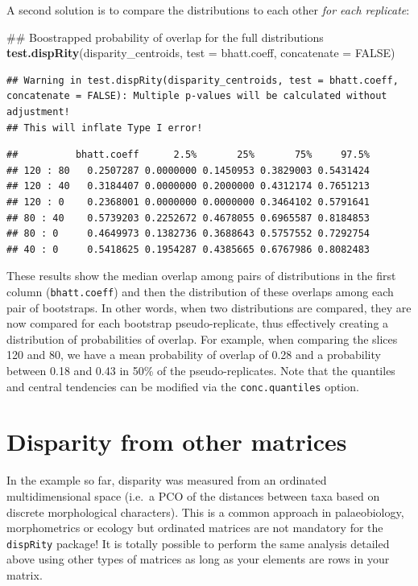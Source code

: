 \documentclass[]{book}
\newenvironment{Shaded}{\begin{snugshade}}{\end{snugshade}}
\newcommand{\KeywordTok}[1]{\textcolor[rgb]{0.13,0.29,0.53}{\textbf{#1}}}
\newcommand{\DataTypeTok}[1]{\textcolor[rgb]{0.13,0.29,0.53}{#1}}
\newcommand{\OtherTok}[1]{\textcolor[rgb]{0.56,0.35,0.01}{#1}}
\newcommand{\NormalTok}[1]{#1}
\theoremstyle{definition}
\theoremstyle{definition}
\theoremstyle{remark}
\begin{document}
A second solution is to compare the distributions to each other
\emph{for each replicate}:

\begin{Shaded}
\begin{Highlighting}[]
\NormalTok{## Boostrapped probability of overlap for the full distributions}
\KeywordTok{test.dispRity}\NormalTok{(disparity_centroids, }\DataTypeTok{test =}\NormalTok{ bhatt.coeff, }\DataTypeTok{concatenate =} \OtherTok{FALSE}\NormalTok{)}
\end{Highlighting}
\end{Shaded}

\begin{verbatim}
## Warning in test.dispRity(disparity_centroids, test = bhatt.coeff, concatenate = FALSE): Multiple p-values will be calculated without adjustment!
## This will inflate Type I error!
\end{verbatim}

\begin{verbatim}
##          bhatt.coeff      2.5%       25%       75%     97.5%
## 120 : 80   0.2507287 0.0000000 0.1450953 0.3829003 0.5431424
## 120 : 40   0.3184407 0.0000000 0.2000000 0.4312174 0.7651213
## 120 : 0    0.2368001 0.0000000 0.0000000 0.3464102 0.5791641
## 80 : 40    0.5739203 0.2252672 0.4678055 0.6965587 0.8184853
## 80 : 0     0.4649973 0.1382736 0.3688643 0.5757552 0.7292754
## 40 : 0     0.5418625 0.1954287 0.4385665 0.6767986 0.8082483
\end{verbatim}

These results show the median overlap among pairs of distributions in
the first column (\texttt{bhatt.coeff}) and then the distribution of
these overlaps among each pair of bootstraps. In other words, when two
distributions are compared, they are now compared for each bootstrap
pseudo-replicate, thus effectively creating a distribution of
probabilities of overlap. For example, when comparing the slices 120 and
80, we have a mean probability of overlap of 0.28 and a probability
between 0.18 and 0.43 in 50\% of the pseudo-replicates. Note that the
quantiles and central tendencies can be modified via the
\texttt{conc.quantiles} option.

\section{Disparity from other
matrices}\label{disparity-from-other-matrices}

In the example so far, disparity was measured from an ordinated
multidimensional space (i.e.~a PCO of the distances between taxa based
on discrete morphological characters). This is a common approach in
palaeobiology, morphometrics or ecology but ordinated matrices are not
mandatory for the \texttt{dispRity} package! It is totally possible to
perform the same analysis detailed above using other types of matrices
as long as your elements are rows in your matrix.
\end{document}
